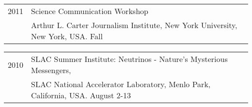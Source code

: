 \documentclass[letterpaper]{article}
\renewenvironment{itemize}{
  \begin{list}{}{
    \setlength{\leftmargin}{1.5em}
  }
}{
  \end{list}
}
\begin{document}
\begin{itemize}
\item \begin{tabular}{ll}
2011 & Science Communication Workshop\\
	& Arthur L. Carter Journalism Institute, New York University, New York, USA.  Fall \\
\end{tabular}

\item \begin{tabular}{ll}
2010 & SLAC Summer Institute: Neutrinos - Nature's Mysterious Messengers, \\ 
	 & SLAC National Accelerator Laboratory, Menlo Park, California, USA.  August 2-13\\
\end{tabular}
\end{itemize}




\end{document}
